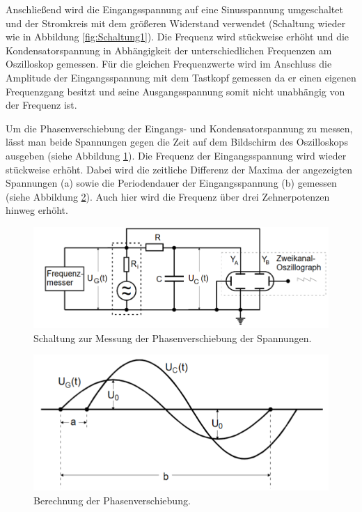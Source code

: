 Anschließend wird die Eingangsspannung auf eine Sinusspannung umgeschaltet und der Stromkreis mit dem größeren Widerstand verwendet
(Schaltung wieder wie in Abbildung \ref{fig:Schaltung1}).
Die Frequenz wird stückweise erhöht und die Kondensatorspannung in Abhängigkeit
der unterschiedlichen Frequenzen am Oszilloskop gemessen. Für die gleichen
Frequenzwerte wird im Anschluss die Amplitude der Eingangsspannung mit dem Tastkopf
gemessen da er einen eigenen Frequenzgang besitzt und seine Ausgangsspannung somit
nicht unabhängig von der Frequenz ist.

Um die Phasenverschiebung der Eingangs- und Kondensatorspannung zu messen,
lässt man beide Spannungen gegen die Zeit auf dem Bildschirm des Oszilloskops ausgeben (siehe Abbildung \ref{fig:Schaltung3}).
Die Frequenz der Eingangsspannung wird wieder stückweise erhöht. Dabei wird
die zeitliche Differenz der Maxima der angezeigten Spannungen (a) sowie die Periodendauer der Eingangsspannung (b)
gemessen (siehe Abbildung \ref{fig:Rechnung}).
Auch hier wird die Frequenz über drei Zehnerpotenzen hinweg erhöht.

\begin{figure}[H]
  \centering
  \includegraphics[width=14cm]{Schaltung3.PNG}
  \caption{Schaltung zur Messung der Phasenverschiebung der Spannungen. \cite{sample}}
  \label{fig:Schaltung3}
\end{figure}

\begin{figure}[H]
  \centering
  \includegraphics[width=14cm]{Rechnung.PNG}
  \caption{Berechnung der Phasenverschiebung. \cite{sample2}}
  \label{fig:Rechnung}
\end{figure}

